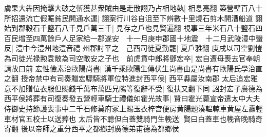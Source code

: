 虜果大犇因掩擊大破之斬獲甚衆賊由是走散詡乃占相地埶|{
	相息亮翻}
築營壁百八十所招還流亡假賑貧民開通水運|{
	詡案行川谷自沮至下辨數十里燒石剪木開漕船道}
詡始到郡穀石千鹽石八千見戶萬三千|{
	見存之戶也見賢遍翻}
視事三年米石八十鹽石四百民增至四萬餘戶人足家給一郡遂安　十一月庚申郡國十地震　十二月武陵澧中蠻反|{
	澧中今澧州地澧音禮}
州郡討平之　己酉司徒夏勤罷|{
	夏戶雅翻}
庚戌以司空劉愷為司徒光禄勲袁敞為司空敞安之子也　前虎賁中郎將鄧宏卒|{
	宏自遭母喪去官奉朝請故曰前}
宏性儉素治歐陽尚書|{
	漢千乘歐陽生傳伏生尚書由是尚書有歐陽氏學治直之翻}
授帝禁中有司奏贈宏驃騎將軍位特進封西平侯|{
	西平縣屬汝南郡}
太后追宏雅意不加贈位衣服但賜錢千萬布萬匹兄隲等復辭不受|{
	復扶又翻下同}
詔封宏子廣德為西平侯將葬有司復奏發五營輕車騎士禮儀如霍光故事|{
	賢曰霍光薨宣帝遣太中大夫侍御史持節護喪事中二千石修莫府冢上賜玉衣梓宫便房黄腸題湊輼輬車黄屋左纛輕車材官五校士以送葬也}
太后皆不聼但白蓋雙騎門生輓送|{
	賢曰白蓋車也輓音晚騎奇寄翻}
後以帝師之重分西平之都鄉封廣德弟甫德為都鄉侯

